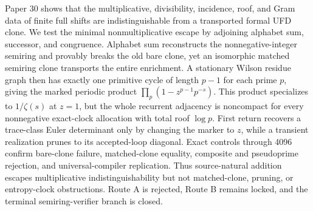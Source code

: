 Paper 30 shows that the multiplicative, divisibility, incidence, roof, and
Gram data of finite full shifts are indistinguishable from a transported
formal UFD clone.  We test the minimal nonmultiplicative escape by adjoining
alphabet sum, successor, and congruence.  Alphabet sum reconstructs the
nonnegative-integer semiring and provably breaks the old bare clone, yet an
isomorphic matched semiring clone transports the entire enrichment.  A
stationary Wilson residue graph then has exactly one primitive cycle of length
$p-1$ for each prime $p$, giving the marked periodic product
$\prod_p(1-z^{p-1}p^{-s})$.  This product specializes to $1/\zeta(s)$ at
$z=1$, but the whole recurrent adjacency is noncompact for every nonnegative
exact-clock allocation with total roof $\log p$.  First return recovers a
trace-class Euler determinant only by changing the marker to $z$, while a
transient realization prunes to its accepted-loop diagonal.  Exact controls
through 4096 confirm bare-clone failure, matched-clone equality, composite and
pseudoprime rejection, and universal-compiler replication.  Thus
source-natural addition escapes multiplicative indistinguishability but not
matched-clone, pruning, or entropy-clock obstructions.  Route A is rejected,
Route B remains locked, and the terminal semiring-verifier branch is closed.

